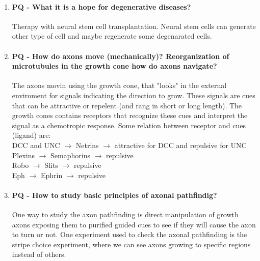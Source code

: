 \documentclass[12pt,article,oneside,a4paper]{memoir}
\begin{document}
\begin{enumerate}
\item \paragraph{PQ - What it is a hope for degenerative diseases?} Therapy with neural stem cell transplantation. Neural stem cells can generate other type of cell and maybe regenerate some degenarated cells.

\item \paragraph{PQ - How do axons move (mechanically)? Reorganization of microtubules in the growth cone how do axons navigate?}
The axons movin using the growth cone, that "looks" in the external enviroment for signals indicating the direction to grow. These signals are cues that can be attractive or repelent (and rang in short or long length). The growth cones contains receptors that recognize these cues and interpret the signal as a chemotropic response.
Some relation between receptor and cues (ligand) are:\\
DCC and UNC $\rightarrow$ Netrins $\rightarrow$ attractive for DCC and repulsive for UNC\\
Plexins $\rightarrow$ Semaphorins $\rightarrow$ repulsive\\
Robo $\rightarrow$ Slits $\rightarrow$ repulsive\\
Eph $\rightarrow$ Ephrin $\rightarrow$ repulsive\\

\item \paragraph{PQ - How to study basic principles of axonal pathfindig?}
One way to study the axon pathfinding is direct manipulation of growth axons exposing them to purified guided cues to see if they will cause the axon to turn or not. One experiment used to check the axonal pathfinding is the stripe choice experiment, where we can see axons growing to specific regions instead of others.


\end{enumerate}
\end{document}
